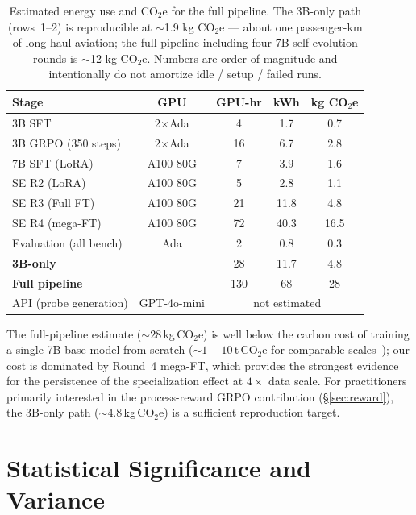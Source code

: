 \documentclass{article}
\begin{document}
\begin{table}[h]
\centering
\footnotesize
\caption{Estimated energy use and CO$_2$e for the full pipeline. The 3B-only path (rows~1--2) is reproducible at $\sim$1.9 kg CO$_2$e --- about one passenger-km of long-haul aviation; the full pipeline including four 7B self-evolution rounds is $\sim$12 kg CO$_2$e. Numbers are order-of-magnitude and intentionally do not amortize idle / setup / failed runs.}
\label{tab:carbon}
\setlength{\tabcolsep}{2.5pt}
\begin{tabular}{@{}lcccc@{}}
\toprule
\textbf{Stage} & \textbf{GPU} & \textbf{GPU-hr} & \textbf{kWh} & \textbf{kg CO$_2$e} \\
\midrule
3B SFT                 & 2$\times$Ada & 4    & 1.7  & 0.7 \\
3B GRPO (350 steps)    & 2$\times$Ada & 16   & 6.7  & 2.8 \\
7B SFT (LoRA)          & A100 80G     & 7    & 3.9  & 1.6 \\
SE R2 (LoRA)           & A100 80G     & 5    & 2.8  & 1.1 \\
SE R3 (Full FT)        & A100 80G     & 21   & 11.8 & 4.8 \\
SE R4 (mega-FT)        & A100 80G     & 72   & 40.3 & 16.5 \\
Evaluation (all bench) & Ada          & 2    & 0.8  & 0.3 \\
\midrule
\textbf{3B-only}      &              & 28   & 11.7 & 4.8 \\
\textbf{Full pipeline}      &              & 130  & 68   & 28 \\
API (probe generation) & GPT-4o-mini  & \multicolumn{3}{c}{not estimated} \\
\bottomrule
\end{tabular}
\end{table}

The full-pipeline estimate ($\sim$$28$\,kg\,CO$_2$e) is well below the carbon cost of training a single 7B base model from scratch ($\sim$$1{-}10$\,t\,CO$_2$e for comparable scales~\citep{strubell2019energy}); our cost is dominated by Round~4 mega-FT, which provides the strongest evidence for the persistence of the specialization effect at $4\times$ data scale.
For practitioners primarily interested in the process-reward GRPO contribution (\S\ref{sec:reward}), the 3B-only path ($\sim$$4.8$\,kg\,CO$_2$e) is a sufficient reproduction target.


\section{Statistical Significance and Variance}
\label{app:significance}
\end{document}
